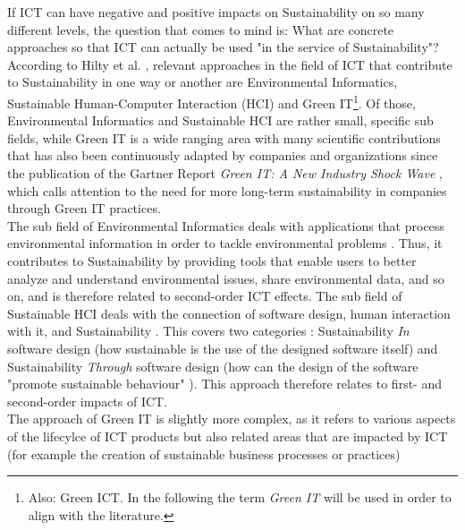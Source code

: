 If ICT can have negative and positive impacts on Sustainability on so many different levels, the question that comes to mind is: What are concrete approaches so that ICT can actually be used "in the service of Sustainability"\cite{hilty11}?\\
According to Hilty et al. \cite{hilty11}, relevant approaches in the field of ICT that contribute to Sustainability in one way or another  are Environmental Informatics, Sustainable Human-Computer Interaction (HCI) %
and Green IT\footnote{Also: Green ICT. In the following the term \textit{Green IT} will be used in order to align with the literature.}. %
 Of those, Environmental Informatics and Sustainable HCI are rather small, specific sub fields, while Green IT is a wide ranging area with many scientific contributions that has also been continuously adapted by companies and organizations %
since the publication of the Gartner Report \textit{Green IT: A New Industry Shock Wave} \cite{gartner07}, which calls attention to the need for more long-term sustainability in companies through Green IT practices.\\ %
The sub field of Environmental Informatics deals with
 applications that process environmental information in order to tackle environmental problems \cite{hilty11}. Thus, it contributes to Sustainability by providing tools that enable users to better analyze and understand environmental issues, share environmental data, and so on, and is therefore related to second-order ICT effects. The sub field of Sustainable HCI deals with the connection of software design, human interaction with it, and Sustainability \cite{hilty11}. This covers two categories \cite{hilty11}: Sustainability \textit{In} software design (how sustainable is the use of the designed software itself) and Sustainability \textit{Through} software design (how can the design of the software "promote sustainable behaviour" \cite{hilty11}). This approach therefore relates to first- and second-order impacts of ICT.\\
The approach of Green IT is slightly more complex, as it refers to various aspects of the lifecylce of ICT products but also related areas that are impacted by ICT (for example the creation of sustainable business processes or practices) %

